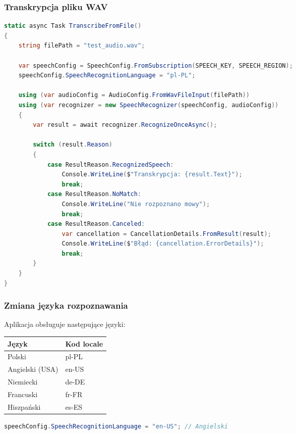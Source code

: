 \subsubsection{Transkrypcja pliku WAV}

\begin{lstlisting}[language=csharp, caption=Funkcja TranscribeFromFile]
static async Task TranscribeFromFile()
{
    string filePath = "test_audio.wav";
    
    var speechConfig = SpeechConfig.FromSubscription(SPEECH_KEY, SPEECH_REGION);
    speechConfig.SpeechRecognitionLanguage = "pl-PL";
    
    using (var audioConfig = AudioConfig.FromWavFileInput(filePath))
    using (var recognizer = new SpeechRecognizer(speechConfig, audioConfig))
    {
        var result = await recognizer.RecognizeOnceAsync();
        
        switch (result.Reason)
        {
            case ResultReason.RecognizedSpeech:
                Console.WriteLine($"Transkrypcja: {result.Text}");
                break;
            case ResultReason.NoMatch:
                Console.WriteLine("Nie rozpoznano mowy");
                break;
            case ResultReason.Canceled:
                var cancellation = CancellationDetails.FromResult(result);
                Console.WriteLine($"Błąd: {cancellation.ErrorDetails}");
                break;
        }
    }
}
\end{lstlisting}

\subsubsection{Zmiana języka rozpoznawania}

Aplikacja obsługuje następujące języki:

\begin{center}
	\begin{tabular}{|l|l|}
		\hline
		\textbf{Język} & \textbf{Kod locale} \\
		\hline
		Polski & pl-PL \\
		Angielski (USA) & en-US \\
		Niemiecki & de-DE \\
		Francuski & fr-FR \\
		Hiszpański & es-ES \\
		\hline
	\end{tabular}
\end{center}

\begin{lstlisting}[language=csharp, caption=Zmiana języka]
speechConfig.SpeechRecognitionLanguage = "en-US"; // Angielski
\end{lstlisting}

